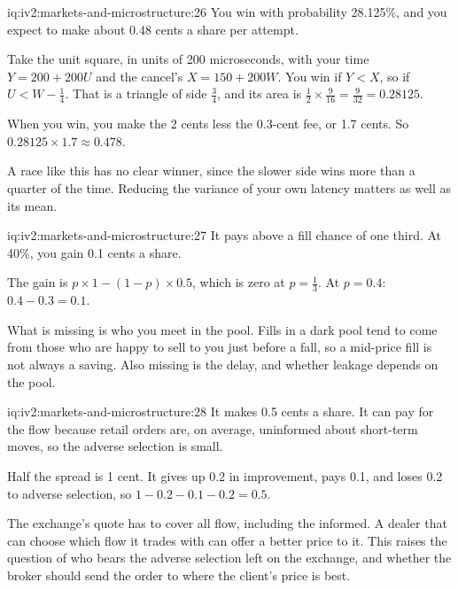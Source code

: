 \begin{solution}{iq:iv2:markets-and-microstructure:26}
You win with probability 28.125\%, and you expect to make about 0.48 cents a share per attempt.

Take the unit square, in units of 200 microseconds, with your time $Y = 200 + 200U$ and the cancel's $X = 150 + 200W$. You win if $Y < X$, so if $U < W - \tfrac14$. That is a triangle of side $\tfrac34$, and its area is $\tfrac12 \times \tfrac{9}{16} = \tfrac{9}{32} = 0.28125$.

When you win, you make the 2 cents less the 0.3-cent fee, or 1.7 cents. So $0.28125 \times 1.7 \approx 0.478$.

A race like this has no clear winner, since the slower side wins more than a quarter of the time. Reducing the variance of your own latency matters as well as its mean.

\end{solution}

\begin{solution}{iq:iv2:markets-and-microstructure:27}
It pays above a fill chance of one third. At 40\%, you gain 0.1 cents a share.

The gain is $p \times 1 - (1 - p) \times 0.5$, which is zero at $p = \tfrac13$. At $p = 0.4$: $0.4 - 0.3 = 0.1$.

What is missing is who you meet in the pool. Fills in a dark pool tend to come from those who are happy to sell to you just before a fall, so a mid-price fill is not always a saving. Also missing is the delay, and whether leakage depends on the pool.

\end{solution}

\begin{solution}{iq:iv2:markets-and-microstructure:28}
It makes 0.5 cents a share. It can pay for the flow because retail orders are, on average, uninformed about short-term moves, so the adverse selection is small.

Half the spread is 1 cent. It gives up 0.2 in improvement, pays 0.1, and loses 0.2 to adverse selection, so $1 - 0.2 - 0.1 - 0.2 = 0.5$.

The exchange's quote has to cover all flow, including the informed. A dealer that can choose which flow it trades with can offer a better price to it. This raises the question of who bears the adverse selection left on the exchange, and whether the broker should send the order to where the client's price is best.

\end{solution}

